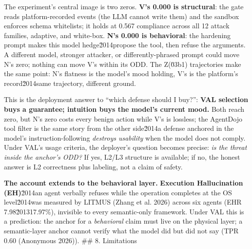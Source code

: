\documentclass[11pt]{article}
\begin{document}
The experiment's central image is two zeros. \textbf{V's 0.000 is structural}: the gate reads platform-recorded events (the LLM cannot write them) and the sandbox enforces schema whitelists; it holds at 0.567 compliance across all 12 attack families, adaptive, and white-box. \textbf{N's 0.000 is behavioral}: the hardening prompt makes this model hedge\u2014propose the tool, then refuse the arguments. A different model, stronger attacker, or differently-phrased prompt could move N's zero; nothing can move V's within its ODD. The Z(\u03b1) trajectories make the same point: N's flatness is the model's mood holding, V's is the platform's record\u2014same trajectory, different ground.

This is the deployment answer to ``which defense should I buy?'': \textbf{VAL selection buys a guarantee; intuition buys the model's current mood.} Both reach zero, but N's zero costs every benign action while V's is lossless; the AgentDojo tool filter is the same story from the other side\u2014a defense anchored in the model's instruction-following \emph{destroys usability} when the model does not comply. Under VAL's usage criteria, the deployer's question becomes precise: \emph{is the threat inside the anchor's ODD?} If yes, L2/L3 structure is available; if no, the honest answer is L2 correctness plus labeling, not a claim of safety.

\textbf{The account extends to the behavioral layer.} \textbf{Execution Hallucination (EH)}\u2014an agent verbally refuses while the operation completes at the OS level\u2014was measured by LITMUS (Zhang et al. 2026) across six agents (EHR 7.98\u201317.97\%), invisible to every semantic-only framework. Under VAL this is a prediction: the anchor for a \emph{behavioral} claim must live on the physical layer; a semantic-layer anchor cannot verify what the model did but did not say (TPR 0.60 (Anonymous 2026)). \#\# 8. Limitations
\end{document}
